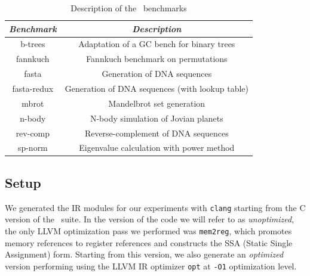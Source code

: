 \begin{table} 
\begin{center}
\begin{small}
    \begin{tabular}{ |c|c| }
        \hline
        {\em Benchmark} & {\em Description} \\ 
        \hline
        \hline
        b-trees & Adaptation of a GC bench for binary trees \\ 
        \hline
        fannkuch & Fannkuch benchmark on permutations \\ 
        \hline
        fasta & Generation of DNA sequences \\ 
        \hline
        fasta-redux & Generation of DNA sequences (with lookup table) \\ 
        \hline
        mbrot & Mandelbrot set generation \\ 
        \hline
        n-body & N-body simulation of Jovian planets \\ 
        \hline
        rev-comp & Reverse-complement of DNA sequences \\ 
        \hline
        sp-norm & Eigenvalue calculation with power method \\ 
        \hline
    \end{tabular} 
\end{small}
\end{center}
\caption{\label{tab:shootout} Description of the \shootout\ benchmarks} 
\end{table}

\subsection{Setup}


We generated the IR modules for our experiments with {\tt clang} starting from the C version of the \shootout\ suite. In the version of the code we will refer to as {\em unoptimized}, the only LLVM optimization pass we performed was {\tt mem2reg}, which promotes memory references to register references and constructs the SSA (Static Single Assignment) form. Starting from this version, we also generate an {\em optimized} version performing using the LLVM IR optimizer {\tt opt} at {\tt -O1} optimization level.

